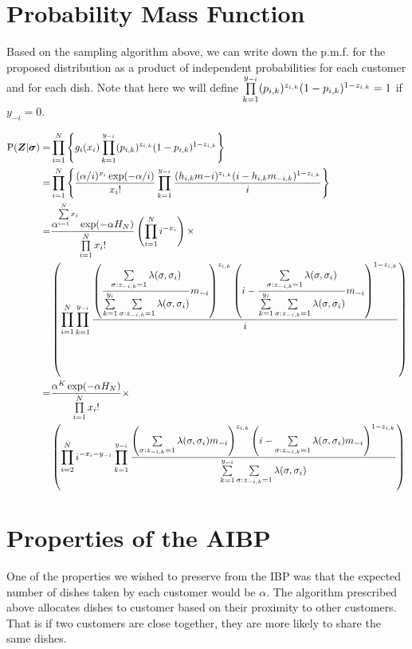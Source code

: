 \section{Probability Mass Function}
Based on the sampling algorithm above, we can write down the p.m.f. for the
proposed distribution as a product of independent probabilities for 
each customer and for each dish. Note that here we will define 
$\prod\limits_{k=1}^{y_{-i}} (p_{i,k})^{z_{i,k}}(1-p_{i,k})^{1-z_{i,k}}=1$ if $y_{-i}=0$.

\begin{align*}
  \text{P}(\bm Z|\bm\sigma)
  =&\prod\limits_{i=1}^{N} \left\{g_i(x_i) \prod\limits_{k=1}^{y_{-i}} 
    (p_{i,k})^{z_{i,k}}(1-p_{i,k})^{1-z_{i,k}}\right\}\\
  =&\prod\limits_{i=1}^{N} \left\{ \displaystyle\frac{(\alpha/i)^{x_i}\exp(-\alpha/i)}{x_i!} 
    \prod\limits_{k=1}^{y_{-i}} 
    \displaystyle\frac{(h_{i,k}m{-i})^{z_{i,k}}(i-h_{i,k}m_{-i,k})^{1-z_{i,k}}}{i} 
    \right\} \\
  =&\displaystyle\frac{\alpha^{\sum\limits_{i=1}^{N}x_i} \exp(-\alpha H_N)} {\prod\limits_{i=1}^{N}x_i!} 
    \left( \prod\limits_{i=1}^{N}i^{-x_i} \right) \times
    \\
    &\left( \prod\limits_{i=1}^{N}\prod\limits_{k=1}^{y_{-i}} 
    \displaystyle\frac{\left(\displaystyle\frac{\sum\limits_{\sigma:z_{-i,k}=1}^{}\lambda(\sigma,\sigma_i)} {\sum\limits_{k=1}^{y_i}\sum\limits_{\sigma:z_{-i,k}=1}^{}\lambda(\sigma,\sigma_i)} m_{-i}\right)^{z_{i,k}}
             \left(i-\displaystyle\frac{\sum\limits_{\sigma:z_{-i,k}=1}^{}\lambda(\sigma,\sigma_i)} {\sum\limits_{k=1}^{y_i}\sum\limits_{\sigma:z_{-i,k}=1}^{}\lambda(\sigma,\sigma_i)} m_{-i}\right)^{1-z_{i,k}}}{i} \right)\\
  =&\displaystyle\frac{\alpha^K \exp(-\alpha H_N)} {\prod\limits_{i=1}^{N}x_i!} \times
    \\
    &\left( \prod\limits_{i=2}^{N} i^{-x_i-y_{-i}}\prod\limits_{k=1}^{y_{-i}} 
    \displaystyle\frac{
    \left(\sum\limits_{\sigma:z_{-i,k}=1}^{}\lambda(\sigma,\sigma_i)m_{-i}\right)^{z_{i,k}}
    \left(i-\sum\limits_{\sigma:z_{-i,k}=1}^{}
    \lambda(\sigma,\sigma_i)m_{-i}\right)^{1-z_{i,k}}
    }
    {\sum\limits_{k=1}^{y_{-i}}\sum\limits_{\sigma:z_{-i,k}=1}^{}\lambda(\sigma,\sigma_i)}\right)
\end{align*}

\section{Properties of the AIBP}
One of the properties we wished to preserve from the IBP was that the expected
number of dishes taken by each customer would be $\alpha$. The algorithm prescribed
above allocates dishes to customer based on their proximity to other customers. 
That is if two customers are close together, they are more likely to share the
same dishes. 




